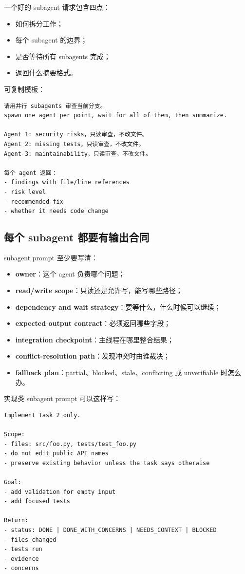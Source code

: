 \documentclass[UTF8,a4paper,11pt,fontset=none]{ctexart}
\newcommand{\keypoint}[1]{\textbf{#1}}
\begin{document}
一个好的 subagent 请求包含四点：

\begin{itemize}
  \item 如何拆分工作；
  \item 每个 subagent 的边界；
  \item 是否等待所有 subagents 完成；
  \item 返回什么摘要格式。
\end{itemize}

可复制模板：

\begin{lstlisting}
请用并行 subagents 审查当前分支。
spawn one agent per point, wait for all of them, then summarize.

Agent 1: security risks，只读审查，不改文件。
Agent 2: missing tests，只读审查，不改文件。
Agent 3: maintainability，只读审查，不改文件。

每个 agent 返回：
- findings with file/line references
- risk level
- recommended fix
- whether it needs code change
\end{lstlisting}

\subsection{每个 subagent 都要有输出合同}

subagent prompt 至少要写清：

\begin{itemize}
  \item \keypoint{owner}：这个 agent 负责哪个问题；
  \item \keypoint{read/write scope}：只读还是允许写，能写哪些路径；
  \item \keypoint{dependency and wait strategy}：要等什么，什么时候可以继续；
  \item \keypoint{expected output contract}：必须返回哪些字段；
  \item \keypoint{integration checkpoint}：主线程在哪里整合结果；
  \item \keypoint{conflict-resolution path}：发现冲突时由谁裁决；
  \item \keypoint{fallback plan}：partial、blocked、stale、conflicting 或 unverifiable 时怎么办。
\end{itemize}

实现类 subagent prompt 可以这样写：

\begin{lstlisting}
Implement Task 2 only.

Scope:
- files: src/foo.py, tests/test_foo.py
- do not edit public API names
- preserve existing behavior unless the task says otherwise

Goal:
- add validation for empty input
- add focused tests

Return:
- status: DONE | DONE_WITH_CONCERNS | NEEDS_CONTEXT | BLOCKED
- files changed
- tests run
- evidence
- concerns
\end{lstlisting}
\end{document}
